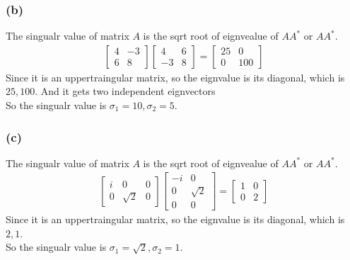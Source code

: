 \documentclass{article}
\begin{document}
\subsubsection*{(b)}
The singualr value of matrix $A$ is the sqrt root of eignvealue of  $AA^*$ or $AA^*$.
\begin{equation*}
    \begin{split}
        \begin{bmatrix}
            4 & -3 \\ 6 & 8
        \end{bmatrix} \begin{bmatrix}
            4 & 6 \\ -3 & 8
        \end{bmatrix} = \begin{bmatrix}
            25 & 0 \\ 0 & 100
        \end{bmatrix}
    \end{split}
\end{equation*}
Since it is an uppertraingular matrix, so the eignvalue is its diagonal, which is $25, 100$. And it gets two independent eignvectors\\
So the singualr value is $\sigma_1 = 10, \sigma_2 = 5$.

\subsubsection*{(c)}
The singualr value of matrix $A$ is the sqrt root of eignvealue of  $AA^*$ or $AA^*$.
\begin{equation*}
    \begin{split}
        \begin{bmatrix}
            i & 0 & 0 \\ 0 & \sqrt{2} & 0
        \end{bmatrix} \begin{bmatrix}
            -i & 0 \\ 0 & \sqrt{2} \\ 0 & 0
        \end{bmatrix} = \begin{bmatrix}
            1 & 0 \\ 0 & 2
        \end{bmatrix}
    \end{split}
\end{equation*}
Since it is an uppertraingular matrix, so the eignvalue is its diagonal, which is $2, 1$.\\
So the singualr value is $\sigma_1 = \sqrt{2}, \sigma_2 = 1$.
\end{document}
